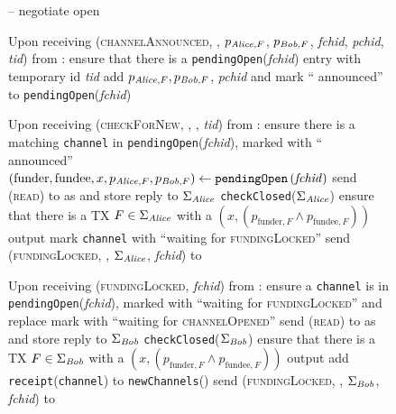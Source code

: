   \begin{figure}[H]
    \begin{systembox}{\fpaynet{} -- negotiate open}
      \begin{algorithmic}[1]
        \State Upon receiving (\textsc{channelAnnounced}, \alice, $p_{\mathit{Alice},
        F}$, $p_{\mathit{Bob}, F}$, \textit{fchid}, \textit{pchid}, \textit{tid}) from
        \simulator:
        \Indent
          \State ensure that there is a \texttt{pendingOpen}(\textit{fchid})
          entry with temporary id \textit{tid}
          \label{alg:fpaynet:announced:valid}
          \State add $p_{\mathit{Alice}, F}, p_{\mathit{Bob}, F}$, \textit{pchid} and  mark
          ``\alice{} announced'' to \texttt{pendingOpen}(\textit{fchid})
          \label{alg:fpaynet:announced:add}
        \EndIndent
        \Statex

        \State Upon receiving (\textsc{checkForNew}, \alice, \bob, \textit{tid})
        from \alice:
        \Indent
          \State ensure there is a matching \texttt{channel} in
          \texttt{pendingOpen}(\textit{fchid}), marked with ``\alice{}
          announced''
          \label{alg:fpaynet:checkForNew:valid}
          \State $\left(\mathrm{funder}, \mathrm{fundee}, x, p_{\mathit{Alice}, F},
          p_{\mathit{Bob}, F}\right) \gets
          \mathtt{pendingOpen}\left(\mathit{fchid}\right)$
          \State send (\textsc{read}) to \ledger{} as \alice{} and store reply
          to $\Sigma_{\mathit{Alice}}$
          \State \texttt{checkClosed}($\Sigma_{\mathit{Alice}}$)
          \label{alg:fpaynet:checkForNew:read:alice}
          \State ensure that there is a TX $F \in \Sigma_{\mathit{Alice}}$ with a
          $\left(x, \left(p_{\mathrm{funder}, F} \wedge p_{\mathrm{fundee},
          F}\right)\right)$ output
          \label{alg:fpaynet:checkForNew:included}
          \State mark \texttt{channel} with ``waiting for
          \textsc{fundingLocked}''
          \label{alg:fpaynet:checkForNew:mark}
          \State send (\textsc{fundingLocked}, \alice, $\Sigma_{\mathit{Alice}}$,
          \textit{fchid}) to \simulator
          \label{alg:fpaynet:checkForNew:sim}
        \EndIndent
        \Statex

        \State Upon receiving (\textsc{fundingLocked}, \textit{fchid}) from
        \simulator:
        \Indent
          \State ensure a \texttt{channel} is in
          \texttt{pendingOpen}(\textit{fchid}), marked with ``waiting for
          \textsc{fundingLocked}'' and replace mark with ``waiting for
          \textsc{channelOpened}''
          \State send (\textsc{read}) to \ledger{} as \bob{} and store reply
          to $\Sigma_{\mathit{Bob}}$
          \State \texttt{checkClosed}($\Sigma_{\mathit{Bob}}$)
          \label{alg:fpaynet:checkForNew:read:bob}
          \State ensure that there is a TX $F \in \Sigma_{\mathit{Bob}}$ with a
          $\left(x, \left(p_{\mathrm{funder}, F} \wedge p_{\mathrm{fundee},
          F}\right)\right)$ output
          \State add \texttt{receipt}(\texttt{channel}) to
          \texttt{newChannels}(\bob)
          \label{alg:fpaynet:fundingLocked:report}
          \State send (\textsc{fundingLocked}, \bob, $\Sigma_{\mathit{Bob}}$,
          \textit{fchid}) to \simulator
          \label{alg:fpaynet:fundingLocked:sim}
        \EndIndent
        \Statex


\end{algorithmic}
\end{systembox}
\end{figure}
